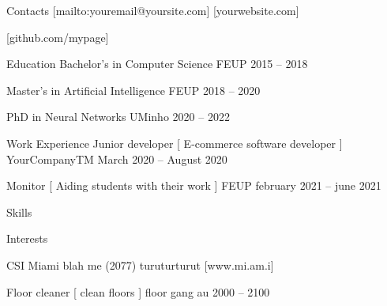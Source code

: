 \begin{mainpane}

	\begin{mainsection}{Contacts}
		[mailto:youremail@yoursite.com]
		[yourwebsite.com]

		[github.com/mypage]
	\end{mainsection}

	\begin{mainsection}{Education}
			\entryJob
            {Bachelor's in Computer Science}
            {FEUP}
            {2015 -- 2018}

			\entryJob
            {Master's in Artificial Intelligence}
            {FEUP}
            {2018 -- 2020}

			\entryJob
            {PhD in Neural Networks}
            {UMinho}
            {2020 -- 2022}
	\end{mainsection}

	\begin{mainsection}{Work Experience}
			\entryJob
            {Junior developer }
			[ E-commerce software developer ]
            {YourCompanyTM}
            {March 2020 -- August 2020}

			\entryJob
            {Monitor }
			[ Aiding students with their work ]
            {FEUP}
            {february 2021 -- june 2021}
	\end{mainsection}

	\begin{mainsection}{Skills}
	\end{mainsection}

	\begin{mainsection}{Interests}





	\end{mainsection}

	\begin{mainsection}{}
		\entryGeneric{}


			 \entryPub
            {CSI Miami}
            {blah}
            {me (2077)}
            {turuturturut}
            [www.mi.am.i]
			

			\entryJob
            {Floor cleaner }
			[ clean floors ]
            {floor gang au}
            {2000 -- 2100}
			
	\end{mainsection}
\end{mainpane}





